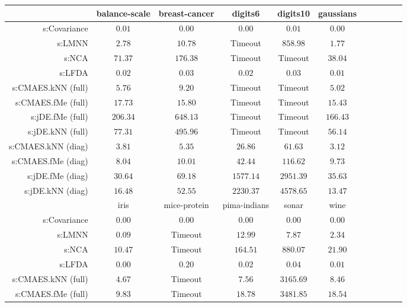 \begin{table}[ht] \centering
{\small\renewcommand{\arraystretch}{1.0}
\setlength{\tabcolsep}{2pt}
\begin{tabular}{rcccccccccc}
\toprule


& \multicolumn{1}{c}{balance-scale} & \multicolumn{1}{c}{breast-cancer} & \multicolumn{1}{c}{digits6} & \multicolumn{1}{c}{digits10} & \multicolumn{1}{c}{gaussians} \\ 
\midrule
s:Covariance & $\bm{0.01}$ & $\bm{0.00}$ & $\bm{0.00}$ & $\bm{0.01}$ & $\bm{0.00}$ \\
s:LMNN & $2.78$ & $10.78$ & Timeout  & $858.98$ & $1.77$ \\
s:NCA & $71.37$ & $176.38$ & Timeout  & Timeout  & $38.04$ \\
s:LFDA & $0.02$ & $0.03$ & $0.02$ & $0.03$ & $0.01$ \\
s:CMAES.kNN (full) & $5.76$ & $9.20$ & Timeout  & Timeout  & $5.02$ \\
s:CMAES.fMe (full) & $17.73$ & $15.80$ & Timeout  & Timeout  & $15.43$ \\
s:jDE.fMe (full) & $206.34$ & $648.13$ & Timeout  & Timeout  & $166.43$ \\
s:jDE.kNN (full) & $77.31$ & $495.96$ & Timeout  & Timeout  & $56.14$ \\
s:CMAES.kNN (diag) & $3.81$ & $5.35$ & $26.86$ & $61.63$ & $3.12$ \\
s:CMAES.fMe (diag) & $8.04$ & $10.01$ & $42.44$ & $116.62$ & $9.73$ \\
s:jDE.fMe (diag) & $30.64$ & $69.18$ & $1577.14$ & $2951.39$ & $35.63$ \\
s:jDE.kNN (diag) & $16.48$ & $52.55$ & $2230.37$ & $4578.65$ & $13.47$ \\
\midrule
& \multicolumn{1}{c}{iris} & \multicolumn{1}{c}{mice-protein} & \multicolumn{1}{c}{pima-indians} & \multicolumn{1}{c}{sonar} & \multicolumn{1}{c}{wine} \\ 
\midrule
s:Covariance & $\bm{0.00}$ & $\bm{0.00}$ & $\bm{0.00}$ & $\bm{0.00}$ & $\bm{0.00}$ \\
s:LMNN & $0.09$ & Timeout  & $12.99$ & $7.87$ & $2.34$ \\
s:NCA & $10.47$ & Timeout  & $164.51$ & $880.07$ & $21.90$ \\
s:LFDA & $\bm{0.00}$ & $0.20$ & $0.02$ & $0.04$ & $0.01$ \\
s:CMAES.kNN (full) & $4.67$ & Timeout  & $7.56$ & $3165.69$ & $8.46$ \\
s:CMAES.fMe (full) & $9.83$ & Timeout  & $18.78$ & $3481.85$ & $18.54$ \\

\end{tabular}}
\end{table}
